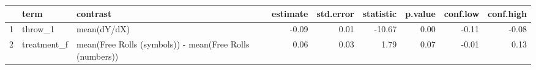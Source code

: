 \begin{table}[ht]
\centering
\begin{tabular}{rllrrrrrr}
  \hline
 & term & contrast & estimate & std.error & statistic & p.value & conf.low & conf.high \\ 
  \hline
1 & throw\_1 & mean(dY/dX) & -0.09 & 0.01 & -10.67 & 0.00 & -0.11 & -0.08 \\ 
  2 & treatment\_f & mean(Free Rolls (symbols)) - mean(Free Rolls (numbers)) & 0.06 & 0.03 & 1.79 & 0.07 & -0.01 & 0.13 \\ 
   \hline
\end{tabular}
\end{table}
